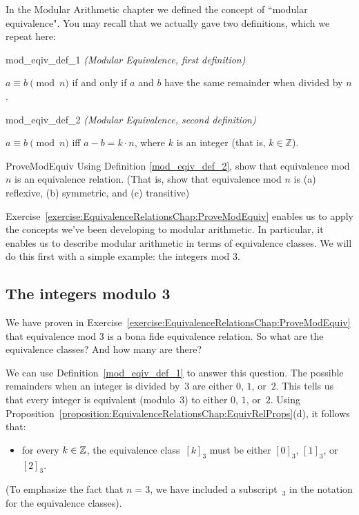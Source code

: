 In the Modular Arithmetic chapter we defined the concept of ``modular equivalence".  You may recall that we actually gave two definitions, which we repeat here: 

\begin{defn}{mod_eqiv_def_1} \emph{(Modular Equivalence, first definition)}

\medskip
$a \equiv b \pmod{n}$ if and only if $a$ and $b$ have the same remainder when divided by $n$.
\end{defn}



\begin{defn}{mod_eqiv_def_2} \emph{(Modular Equivalence, second definition)}

\medskip
$a \equiv b \pmod{n}$ iff $a - b = k \cdot n$, where $k$ is an integer (that is, $k \in  {\mathbb Z}$). 
\end{defn}

\begin{exercise}{ProveModEquiv}
Using  Definition  \ref{mod_eqiv_def_2}, show that equivalence mod $n$ is an equivalence relation. (That is, show that equivalence mod $n$ is (a) reflexive, (b) symmetric, and (c) transitive)
\end{exercise}

Exercise~\ref{exercise:EquivalenceRelationsChap:ProveModEquiv} enables us to apply the concepts we've been developing to modular arithmetic. In particular, it enables us to describe modular arithmetic in terms of equivalence classes. We will do this first with a simple example: the integers mod 3.

\subsection{The integers modulo 3}\label{sec:intMod3}

We have proven in Exercise~\ref{exercise:EquivalenceRelationsChap:ProveModEquiv} that equivalence mod 3 is a bona fide equivalence relation. So what are the equivalence classes? And how many are there?
\medskip

We can use Definition~\ref{mod_eqiv_def_1} to answer this question. The possible remainders when an integer is divided by~$3$ are either $0$, $1$, or~$2$. This tells us that  every integer is equivalent (modulo~$3$) to either $0$, $1$, or~$2$. Using Proposition~\ref{proposition:EquivalenceRelationsChap:EquivRelProps}(d), it follows that:
\begin{itemize}
\item[] for every $k \in \mathbb{Z}$, the equivalence class~$[k]_3$ must be either $[0]_3$, $[1]_3$, or~$[2]_3$.
\end{itemize}
(To emphasize the fact that $n = 3$, we have included a subscript~${}_3$ in the notation for the equivalence classes).

